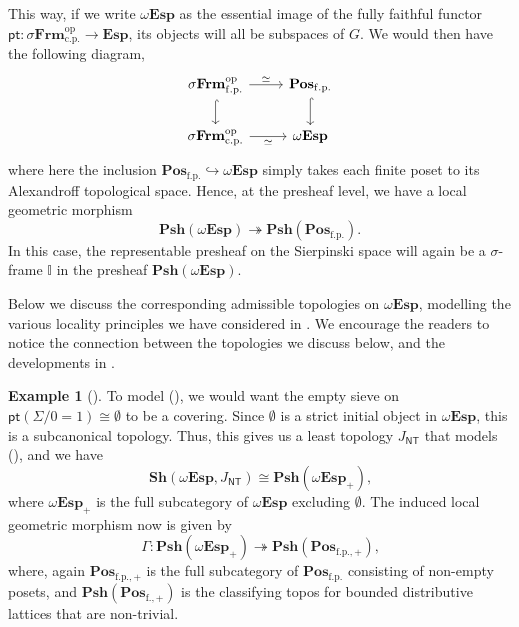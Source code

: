 \documentclass[a4paper,12pt]{amsart}
\theoremstyle{definition}
\newtheorem{example}[theorem]{Example}
\newcommand{\mb}[1]{\mathbf{#1}}
\newcommand{\mbb}[1]{\mathbb{#1}}
\newcommand{\I}{\mbb I}
\newcommand{\mr}[1]{\mathrm{#1}}
\newcommand{\ms}[1]{\mathsf{#1}}
\newcommand{\Pos}{\mb{Pos}}
\newcommand{\sh}{\mb{Sh}}
\newcommand{\psh}{\mb{Psh}}
\newcommand{\op}{^{\mathrm{op}}}
\newcommand{\surj}{\twoheadrightarrow}
\newcommand{\hook}{\hookrightarrow}
\newcommand{\fp}{_{\mr{f.p.}}}
\newcommand{\cp}{_{\mr{c.p.}}}
\newcommand{\emp}{\emptyset}
\newcommand{\pt}{\ms{pt}}
\newcommand{\sFrm}{\sigma\mb{Frm}}
\newcommand{\Topp}{\mb{Esp}}
\newcommand{\wTop}{\omega\mb{Esp}}
\begin{document}
This way, if we write $\wTop$ as the essential image of the fully faithful functor $\pt \colon \sFrm\cp\op \to \Topp$, its objects will all be subspaces of $G$. We would then have the following diagram,
\[
\begin{tikzcd}
  \sFrm\fp\op \ar[d, hook] \ar[r, "\simeq"] & \Pos\fp \ar[d, hook] \\
  \sFrm\cp\op \ar[r, "\simeq"'] & \wTop
\end{tikzcd}
\]
where here the inclusion $\Pos\fp \hook \wTop$ simply takes each finite poset to its Alexandroff topological space. Hence, at the presheaf level, we have a local geometric morphism
\[ \psh(\wTop) \surj \psh(\Pos\fp)\text{.} \]
In this case, the representable presheaf on the Sierpinski space will again be a $\sigma$-frame $\I$ in the presheaf $\psh(\wTop)$.

Below we discuss the corresponding admissible topologies on $\wTop$, modelling the various locality principles we have considered in . We encourage the readers to notice the connection between the topologies we discuss below, and the developments in .

\begin{example}[\AxiomNT]
  To model (\AxiomNT), we would want the empty sieve on $\pt(\Sigma/0=1) \cong \emp$ to be a covering. Since $\emp$ is a strict initial object in $\wTop$, this is a subcanonical topology. Thus, this gives us a least topology $J_{\ms{NT}}$ that models (\AxiomNT), and we have
  \[ \sh(\wTop,J_{\ms{NT}}) \cong \psh(\wTop_+)\text{,} \]
  where $\wTop_+$ is the full subcategory of $\wTop$ excluding $\emp$. The induced local geometric morphism now is given by 
  \[ \Gamma \colon \psh(\wTop_+) \surj \psh(\Pos_{\mr{f.p.,+}})\text{,} \]
  where, again $\Pos_{\mr{f.p.,+}}$ is the full subcategory of $\Pos_{\mr{f.p.}}$ consisting of non-empty posets, and $\psh(\Pos_{\mr{f.,+}})$ is the classifying topos for bounded distributive lattices that are non-trivial.
\end{example}
\end{document}
